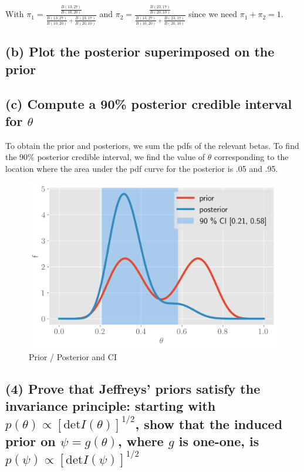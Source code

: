 \documentclass[11pt]{article}
\begin{document}
With $\pi_1 = \frac{\frac{B(13, 27)}{B(10, 20)}}{\frac{B(13, 27)}{B(10, 20)} + \frac{B(23, 17)}{B(20, 10)}}$ and  $\pi_2 = \frac{\frac{B(23, 17)}{B(20, 10)}}{\frac{B(13, 27)}{B(10, 20)} + \frac{B(23, 17)}{B(20, 10)}}$ since we need $\pi_1 + \pi_2 = 1$.

\subsection*{(b) Plot the posterior superimposed on the prior}
\subsection*{(c) Compute a 90\% posterior credible interval for $\theta$}

To obtain the prior and posteriors, we sum the pdfs of the relevant betas. To find the 90\% posterior credible interval, we find the value of $\theta$ corresponding to the location where the area under the pdf curve for the posterior is .05 and .95. 

\begin{figure}[!h]
    \centering
    \includegraphics[scale=.6
    ]{homework_3/figures/binom.png}
    \caption{Prior / Posterior and CI}
    \label{fig:my_label}
\end{figure}
\newpage
\subsection*{(4) Prove that Jeffreys’ priors satisfy the invariance principle: starting with $p(\theta) \propto [\text{det}I(\theta)]^{1/2}$, show that the induced prior on $\psi = g(\theta)$, where $g$ is one-one, is
$p(\psi) \propto [\text{det}I(\psi)]^{1/2}$}
\end{document}
